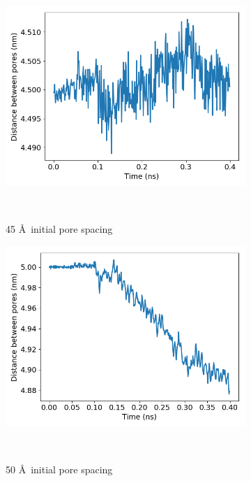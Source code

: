 \documentclass{article}
\begin{document}
\begin{enumerate}
\begin{figure}[htp]
		\begin{subfigure}{0.3\textwidth}
			\includegraphics[width=\textwidth]{p2p_45.png}
			\vspace{-1.25em}
			\caption{45 \AA~initial pore spacing}~\label{fig:p2p_45}
		\end{subfigure}
		\begin{subfigure}{0.3\textwidth}
			\includegraphics[width=\textwidth]{p2p_50.png}\quad	
			\vspace{-1.25em}
			\caption{50 \AA~initial pore spacing}~\label{fig:p2p_50}
		\end{subfigure}
		\begin{subfigure}{0.3\textwidth}

\end{subfigure}
\end{figure}
\end{enumerate}
\end{document}
